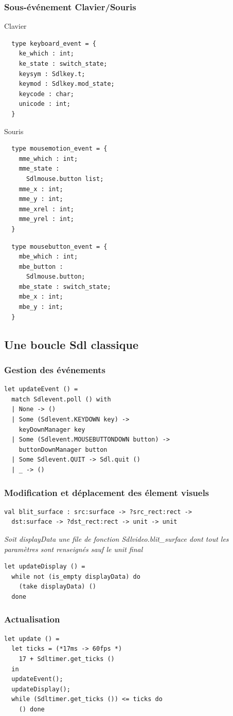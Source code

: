 \begin{frame}[fragile]
	\frametitle{Sous-événement Clavier/Souris}
	\lstset{basicstyle=\scriptsize}
	\begin{block}{Clavier}
		\begin{lstlisting}
  type keyboard_event = {
    ke_which : int;
    ke_state : switch_state;
    keysym : Sdlkey.t;
    keymod : Sdlkey.mod_state;
    keycode : char;
    unicode : int;
  }
		\end{lstlisting}
	\end{block}
	\begin{block}{Souris}
		\begin{minipage}{0.47\textwidth}
			\begin{lstlisting}
  type mousemotion_event = {
    mme_which : int;
    mme_state : 
      Sdlmouse.button list;
    mme_x : int;
    mme_y : int;
    mme_xrel : int;
    mme_yrel : int;
  }
			\end{lstlisting}
		\end{minipage}
		\begin{minipage}{0.4\textwidth}
			\begin{lstlisting}
  type mousebutton_event = {
    mbe_which : int;
    mbe_button : 
      Sdlmouse.button;
    mbe_state : switch_state;
    mbe_x : int;
    mbe_y : int;
  }
			\end{lstlisting}
		\end{minipage}
	\end{block}
\end{frame}

\subsection{Une boucle Sdl classique} %
\begin{frame}[fragile]
	\frametitle{Gestion des événements}
	\begin{lstlisting}
let updateEvent () = 
  match Sdlevent.poll () with
  | None -> ()
  | Some (Sdlevent.KEYDOWN key) -> 
    keyDownManager key
  | Some (Sdlevent.MOUSEBUTTONDOWN button) -> 
    buttonDownManager button
  | Some Sdlevent.QUIT -> Sdl.quit ()
  | _ -> ()
	\end{lstlisting}
\end{frame}

\begin{frame}[fragile]
	\frametitle{Modification et déplacement des élement visuels}
	\lstset{basicstyle=\scriptsize}
	\begin{lstlisting}
val blit_surface : src:surface -> ?src_rect:rect -> 
  dst:surface -> ?dst_rect:rect -> unit -> unit
	\end{lstlisting}
	\textit{Soit displayData une file de fonction Sdlvideo.blit\_surface dont tout les paramètres sont renseignés sauf le unit final}
	\lstset{basicstyle=\normalsize}
	\begin{lstlisting}
let updateDisplay () = 
  while not (is_empty displayData) do
    (take displayData) ()
  done
	\end{lstlisting}
\end{frame}

\begin{frame}[fragile]
	\frametitle{Actualisation}
	\begin{lstlisting}
let update () =
  let ticks = (*17ms -> 60fps *) 
    17 + Sdltimer.get_ticks () 
  in
  updateEvent();
  updateDisplay();
  while (Sdltimer.get_ticks ()) <= ticks do 
    () done
	\end{lstlisting}
\end{frame}
